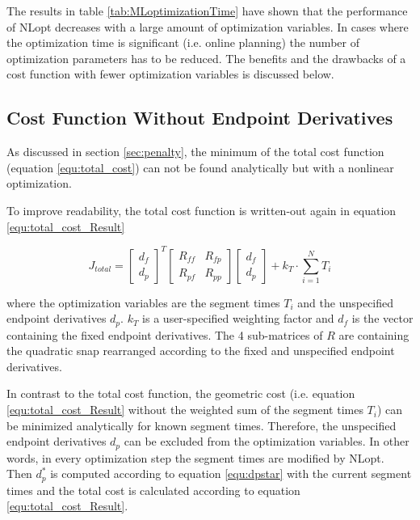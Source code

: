 The results in table \ref{tab:MLoptimizationTime} have shown that the performance of NLopt decreases with a large amount of optimization variables. In cases where the optimization time is significant (i.e. online planning) the number of optimization parameters has to be reduced. The benefits and the drawbacks of a cost function with fewer optimization variables is discussed below.

\subsection{Cost Function Without Endpoint Derivatives}

As discussed in section \ref{sec:penalty}, the minimum of the total cost function (equation \ref{equ:total_cost}) can not be found analytically but with a nonlinear optimization. \newpage

To improve readability, the total cost function is written-out again in equation \ref{equ:total_cost_Result}


\begin{equation}
J_{total} =
\begin{bmatrix}
   d_f \\
  d_p
\end{bmatrix}^T
\begin{bmatrix}
   R_{ff} & R_{fp} \\
  R_{pf} & R_{pp}
\end{bmatrix}
\begin{bmatrix}
   d_f \\
  d_p
\end{bmatrix}
+ k_T \cdot \sum_{i=1}^N T_i
\label{equ:total_cost_Result}
\end{equation}

where the optimization variables are the segment times $T_i$ and the unspecified endpoint derivatives $d_p$. $k_T$ is a user-specified weighting factor and $d_f$ is the vector containing the fixed endpoint derivatives. The 4 sub-matrices of $R$ are containing the quadratic snap rearranged according to the fixed and unspecified endpoint derivatives. \newline

In contrast to the total cost function, the geometric cost (i.e. equation \ref{equ:total_cost_Result} without the weighted sum of the segment times $T_i$) can be minimized analytically for known segment times. Therefore, the unspecified endpoint derivatives $d_p$ can be excluded from the optimization variables. In other words, in every optimization step the segment times are modified by NLopt. Then $d_p^* $ is computed according to equation \ref{equ:dpstar} with the current segment times and the total cost is calculated according to equation \ref{equ:total_cost_Result}. \newline

